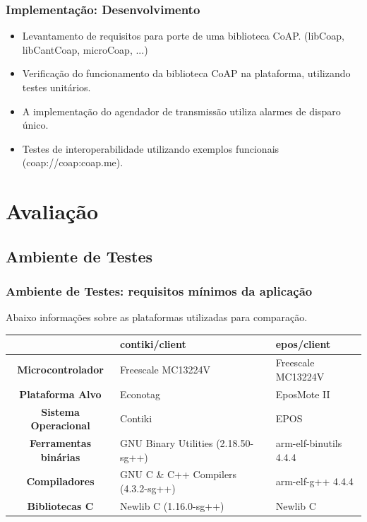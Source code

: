 \documentclass{beamer}
\begin{document}
\begin{frame}
\frametitle{Implementação: Desenvolvimento}
\begin{itemize}
    \item Levantamento de requisitos para porte de uma biblioteca CoAP. (libCoap, libCantCoap, microCoap, ...)
    \item Verificação do funcionamento da biblioteca CoAP na plataforma, utilizando testes unitários.
    \item A implementação do agendador de transmissão utiliza alarmes de disparo único.
    \item Testes de interoperabilidade utilizando exemplos funcionais (coap://coap:coap.me).
\end{itemize}
\end{frame}

\section{Avaliação}

\subsection{Ambiente de Testes}
\begin{frame}
\frametitle{Ambiente de Testes: requisitos mínimos da aplicação}
Abaixo informações sobre as plataformas utilizadas para comparação.
 \begin{table}[!ht]
  \centering
  \scriptsize
  \begin{tabular}{|c|p{3cm}|p{3cm}|}
	\hline
	& \textbf{contiki/client} & \textbf{epos/client}  \\ \hline
	\textbf{Microcontrolador}	  	  & Freescale MC13224V & Freescale MC13224V \\ \hline 
	\textbf{Plataforma Alvo}    & Econotag & EposMote II\\ \hline    
	\textbf{Sistema Operacional}    & Contiki & EPOS \\ \hline    
    \textbf{Ferramentas binárias}		  & GNU Binary Utilities (2.18.50-sg++) & arm-elf-binutils 4.4.4 \\ \hline
    \textbf{Compiladores}		  & GNU C \& C++ Compilers (4.3.2-sg++) & arm-elf-g++ 4.4.4\\ \hline
    \textbf{Bibliotecas C}          & Newlib C (1.16.0-sg++) & Newlib C \\ \hline 
	\end{tabular}
  \end{table}
\end{frame}
\end{document}
